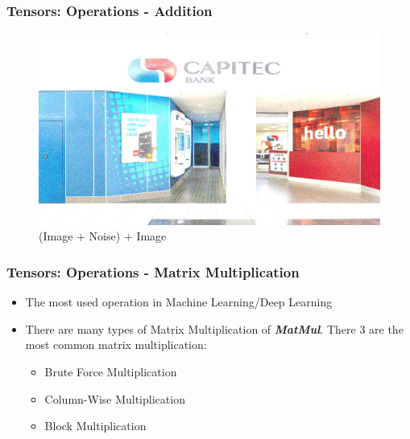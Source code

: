 \documentclass[11pt]{beamer}
\begin{document}
\begin{frame}
	\frametitle{Tensors: Operations - Addition}
	\begin{figure}
		\includegraphics[scale=0.17]{"4 - gn_img_avg"}
		\caption{(Image + Noise) + Image}
	\end{figure}
\end{frame}

\begin{frame}
	\frametitle{Tensors: Operations - Matrix Multiplication}
\begin{itemize}
	\item The most used operation in Machine Learning/Deep Learning
	\item There are many types of Matrix Multiplication of \textit{\textbf{MatMul}}. There 3 are the most common matrix multiplication:
	\begin{itemize}
		\item Brute Force Multiplication
		\item Column-Wise Multiplication
		\item Block Multiplication		
	\end{itemize}
\end{itemize}
\end{frame}
\end{document}
